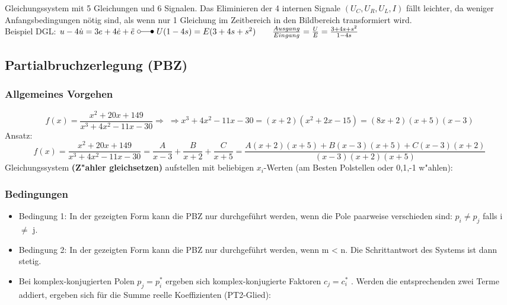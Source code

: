 Gleichungssystem mit 5 Gleichungen und 6 Signalen. Das Eliminieren der 4 internen Signale $(U_{C}, U_{R}, U_{L}, I)$ fällt leichter, da weniger Anfangsbedingungen nötig sind, als wenn nur 1 Gleichung im Zeitbereich in den Bildbereich transformiert wird.\\
Beispiel DGL: $u-4\dot{u}=3e+4\dot{e}+\ddot{e} \ \laplace \ U(1-4s)=E(3+4s+s^2) \qquad \frac{Ausgang}{Eingang}=\frac{U}{E}=\frac{3+4s+s^2}{1-4s}$

\subsection{Partialbruchzerlegung (PBZ)}
\subsubsection{Allgemeines Vorgehen}			\[f(x)=\frac{x^2+20x+149}{x^3+4x^2-11x-30} \Rightarrow \; \Rightarrow x^{3}+4x^{2}-11x-30=(x+2)(x^{2}+2x-15)=(8x+2)(x+5)(x-3)\]
			Ansatz:
			\[f(x)=\frac{x^2+20x+149}{x^3+4x^2-11x-30}=\frac{A}{x-3} + \frac{B}{x+2} + \frac{C}{x+5}=
			\frac{A(x+2)(x+5)+B(x-3)(x+5)+C(x-3)(x+2)}{(x-3)(x+2)(x+5)}\]
			Gleichungssystem \textbf{(Z"ahler gleichsetzen)} aufstellen mit beliebigen $x_i$-Werten (am Besten Polstellen oder 0,1,-1 w"ahlen):
\subsubsection{Bedingungen}
\begin{itemize}
\item Bedingung 1: In der gezeigten Form kann die PBZ nur durchgeführt werden,
wenn die Pole paarweise verschieden sind: $p_{i} \neq p_{j}$ falls i $\neq$ j.
\item Bedingung 2: In der gezeigten Form kann die PBZ nur durchgeführt werden, wenn m < n. Die Schrittantwort des Systems ist dann stetig.
\item Bei komplex-konjugierten Polen $p_{j} = p^{\ast}_{i}$ ergeben sich komplex-konjugierte Faktoren
$c_{j} = c^{\ast}_{i}$ . Werden die entsprechenden zwei Terme addiert, ergeben sich
für die Summe reelle Koeffizienten (PT2-Glied):
\end{itemize}
